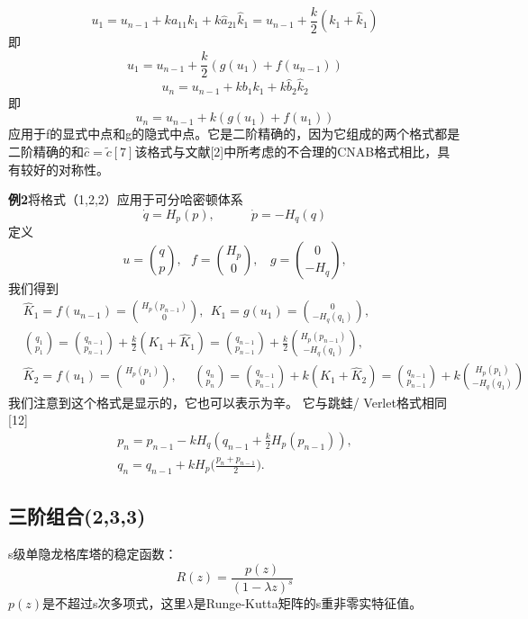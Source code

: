 \documentclass[12pt,a4paper]{article}
\numberwithin{equation}{section}
\begin{document}
\begin{equation*}
u_{1}=u_{n-1}+ka_{11}k_{1}+k\hat{a}_{21}\hat{k}_{1}=u_{n-1}+\frac{k}{2}(k_{1}+\hat{k}_{1})
\end{equation*}
即
\begin{equation*}
u_{1}=u_{n-1}+\frac{k}{2}(g(u_{1})+f(u_{n-1}))
\end{equation*}
\begin{equation*}
u_{n}=u_{n-1}+kb_{1}k_{1}+k\hat{b}_{2}\hat{k}_{2}
\end{equation*}
即
\begin{equation*}
u_{n}=u_{n-1}+k(g(u_{1})+f(u_{1}))
\end{equation*}
应用于f的显式中点和g的隐式中点。它是二阶精确的，因为它组成的两个格式都是二阶精确的和$\widehat{c}=\tilde{c}[7]$该格式与文献[2]中所考虑的不合理的CNAB格式相比，具有较好的对称性。

\textbf{例2}将格式（1,2,2）应用于可分哈密顿体系
\begin{equation}
\dot{q}=H_{p}(p),~~~~~~~~~~~~~\dot{p}=-H_{q}(q)
\end{equation}
定义
\begin{equation}
u=\binom{q}{p},~~~f=\binom{H_{p}}{0},~~~~g=\binom{0}{-H_{q}},
\end{equation}
我们得到
\begin{align}
&\widehat{K}_{1}=f(u_{n-1})=\binom{H_{p}(p_{n-1})}{0},~~K_{1}=g(u_{1})=\binom{0}{-H_{q}(q_{1})},\\
&\binom{q_{1}}{p_{1}}=\binom{q_{n-1}}{p_{n-1}}+\frac{k}{2}(K_{1}+\widehat{K}_{1})=\binom{q_{n-1}}{p_{n-1}}+\frac{k}{2}\binom{H_{p}(p_{n-1})}{-H_{q}(q_{1})},\\
&\widehat{K}_{2}=f(u_{1})=\binom{H_{p}(p_{1})}{0},~~~~~~\binom{q_{n}}{p_{n}}=\binom{q_{n-1}}{p_{n-1}}+k(K_{1}+\widehat{K}_{2})=\binom{q_{n-1}}{p_{n-1}}+k\binom{H_{p}(p_{1})}{-H_{q}(q_{1})}
\end{align}
我们注意到这个格式是显示的，它也可以表示为辛。 它与跳蛙/ Verlet格式相同[12] 
\begin{gather}
p_{n}=p_{n-1}-kH_{q}(q_{n-1}+\frac{k}{2}H_{p}(p_{n-1})),\\
q_{n}=q_{n-1}+kH_{p}\bigg(\frac{p_{n}+p_{n-1}}{2}\biggl).
\end{gather}
\subsection{三阶组合(2,3,3)}
s级单隐龙格库塔的稳定函数：
\begin{equation*}
R(z)=\frac{p(z)}{(1-\lambda z)^s}
\end{equation*}
$p(z)$是不超过s次多项式，这里$\lambda$是Runge-Kutta矩阵的s重非零实特征值。
\end{document}
